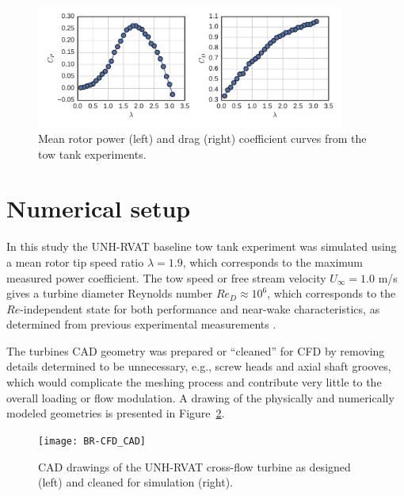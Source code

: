 \documentclass[aip,graphicx]{revtex4-1}
\begin{document}
\begin{figure}[ht]
    \centering

    \includegraphics[width=0.9\textwidth]{figures/exp_perf}

    \caption{Mean rotor power (left) and drag (right) coefficient curves from
        the tow tank experiments\cite{Bachant2015-RVAT-Re-dep-data}.}

    \label{fig:exp_perf}
\end{figure}


\section{Numerical setup}

In this study the UNH-RVAT baseline tow tank experiment was simulated using a
mean rotor tip speed ratio $\lambda=1.9$, which corresponds to the maximum
measured power coefficient. The tow speed or free stream velocity $U_\infty=1.0$
m/s gives a turbine diameter Reynolds number $Re_D \approx 10^6$, which
corresponds to the $Re$-independent state for both performance and near-wake
characteristics, as determined from previous experimental measurements
\cite{Bachant2014, Bachant2016-Energies}.

The turbines CAD geometry was prepared or ``cleaned'' for CFD by removing
details determined to be unnecessary, e.g., screw heads and axial shaft grooves,
which would complicate the meshing process and contribute very little to the
overall loading or flow modulation. A drawing of the physically and numerically
modeled geometries is presented in Figure~\ref{fig:cfd-cad}.

\begin{figure}
    \centering
    
    \texttt{[image: BR-CFD\_CAD]}
    
    \caption{CAD drawings of the UNH-RVAT cross-flow turbine as designed (left)
        and cleaned for simulation (right).}
    
    \label{fig:cfd-cad}
\end{figure}
\end{document}
